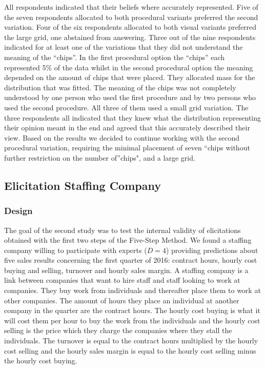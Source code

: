 \documentclass[openright,titlepage,12pt,a4paper]{book}
\begin{document}
All respondents indicated that their beliefs where accurately represented. Five of the seven respondents allocated to both procedural variants preferred the second variation. Four of the six respondents allocated to both visual variants preferred the large grid, one abstained from answering. Three out of the nine respondents indicated for at least one of the variations that they did not understand the meaning of the ``chips''. In
the first procedural option the ``chips'' each represented 5\% of the data whilst in the second procedural option the meaning depended on the amount of chips that were placed. They allocated mass for the distribution that was fitted. The meaning of the chips was not completely understood by one person who used the first procedure and by two persons who used the second procedure. All three of them used a small grid variation. The three respondents all indicated that they knew what the distribution representing their opinion meant in the end and agreed that this accurately described their view. Based on the results we decided to continue working with the second procedural variation, requiring the minimal placement of seven ``chips without further restriction on the number of''chips", and a large grid.

\hypertarget{elicitation-staffing-company}{%
\subsection{Elicitation Staffing Company}\label{elicitation-staffing-company}}

\hypertarget{design-1}{%
\subsubsection{Design}\label{design-1}}

The goal of the second study was to test the internal validity of elicitations obtained with the first two steps of the Five-Step Method. We found a staffing company willing to participate with experts (\(D=4\)) providing predictions about five sales results concerning the first quarter of 2016: contract hours, hourly cost buying and selling, turnover and hourly sales margin. A staffing company is a link between companies that want to hire staff and staff looking to work at companies. They buy work from individuals and thereafter place them to work at other companies. The amount of hours they place an individual at another company in the quarter are the contract hours. The hourly cost buying is what it will cost them per hour to buy the work from the individuals and the hourly cost selling is the price which they charge the companies where they stall the individuals. The turnover is equal to the contract hours multiplied by the hourly cost selling and the hourly sales margin is equal to the hourly cost selling minus the hourly cost buying.
\end{document}
